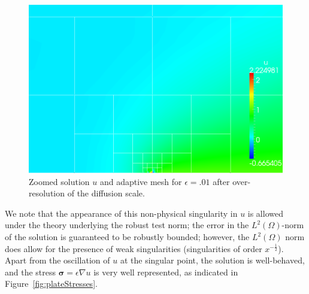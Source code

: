 \documentclass[letterpaper]{article}
\def\bfsigma{\boldsymbol\sigma}
\newcommand{\LRp}[1]{\left( #1 \right)}
\newcommand{\Grad} {\ensuremath{\nabla}}
\renewcommand{\L}{L^2\LRp{\Omega}}
\begin{document}
\begin{figure}[!h]
\centering
\includegraphics[scale=.375]{figs/LaplaceFigs/confusion1e2h1e3uZoom.png}
\caption{Zoomed solution $u$ and adaptive mesh for $\epsilon = .01$ after over-resolution of the diffusion scale. }
\label{fig:plateOscZoom}
\end{figure}

We note that the appearance of this non-physical singularity in $u$ is allowed
under the theory underlying the robust test norm; the error in the $\L$-norm
of the solution is guaranteed to be robustly bounded; however, the $\L$ norm
does allow for the presence of weak singularities (singularities of order
$x^{-\frac{1}{2}}$).  Apart from the oscillation of $u$ at the singular point,
the solution is well-behaved, and the stress $\bfsigma = \epsilon \Grad u$ is
very well represented, as indicated in Figure~\ref{fig:plateStresses}.
\end{document}
